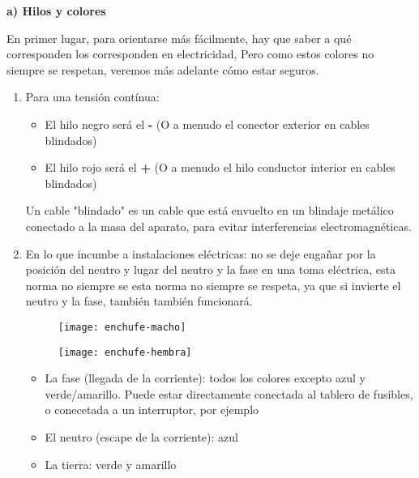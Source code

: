 \begin{large}
\textbf{a) Hilos y colores}\\
\end{large}
En primer lugar, para orientarse más fácilmente, hay que saber a qué corresponden los
corresponden en electricidad,
Pero como estos colores no siempre se respetan, veremos más adelante cómo estar seguros.
\begin{enumerate}
\item Para una tensión contínua:
\begin{itemize}
\item El hilo negro será el \textbf{-} (O a menudo el conector exterior en cables blindados)
\item El hilo rojo será el \textbf{+} (O a menudo el hilo conductor interior en cables blindados)
\end{itemize}


\begin{normalize}
Un cable "blindado" es un cable que está envuelto en un blindaje metálico conectado a la masa del aparato, para evitar interferencias electromagnéticas.
\end{normalize}

\item En lo que incumbe a instalaciones eléctricas: no se deje engañar por la posición del neutro y lugar del neutro y la fase en una toma eléctrica, esta norma no siempre se
esta norma no siempre se respeta, ya que si invierte el neutro y la fase, también
también funcionará.

\begin{figure}[h]
    \centering
    \begin{minipage}[b]{0.45\textwidth}
        \centering
        \texttt{[image: enchufe-macho]} 
    \end{minipage}
    \hfill
    \begin{minipage}[b]{0.45\textwidth}
        \centering
        \texttt{[image: enchufe-hembra]} 
    \end{minipage}
\end{figure}

\begin{itemize}
\item La fase (llegada de la corriente): todos los colores excepto azul y verde/amarillo. Puede estar directamente conectada al tablero de fusibles, o conecetada a un interruptor, por ejemplo
\item El neutro (escape de la corriente): azul
\item La tierra: verde y amarillo
\end{itemize}

\end{enumerate}

